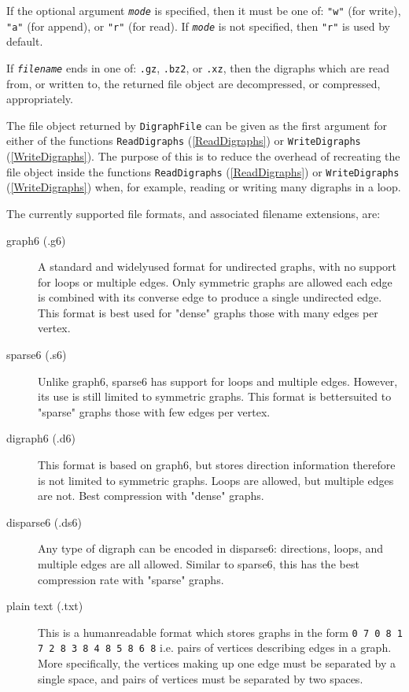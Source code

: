 \documentclass[a4paper,11pt]{report}
\begin{document}
{{{ If the optional argument \mbox{\texttt{\mdseries\slshape mode}} is specified, then it must be one of: \texttt{"w"} (for write), \texttt{"a"} (for append), or \texttt{"r"} (for read). If \mbox{\texttt{\mdseries\slshape mode}} is not specified, then \texttt{"r"} is used by default. 

 If \mbox{\texttt{\mdseries\slshape filename}} ends in one of: \texttt{.gz}, \texttt{.bz2}, or \texttt{.xz}, then the digraphs which are read from, or written to, the returned file
object are decompressed, or compressed, appropriately. 

 The file object returned by \texttt{DigraphFile} can be given as the first argument for either of the functions \texttt{ReadDigraphs} (\ref{ReadDigraphs}) or \texttt{WriteDigraphs} (\ref{WriteDigraphs}). The purpose of this is to reduce the overhead of recreating the file object
inside the functions \texttt{ReadDigraphs} (\ref{ReadDigraphs}) or \texttt{WriteDigraphs} (\ref{WriteDigraphs}) when, for example, reading or writing many digraphs in a loop. 

 The currently supported file formats, and associated filename extensions, are: 
\begin{description}
\item[{graph6 (.g6)}]  A standard and widely\texttt{}used format for undirected graphs,
with no support for loops or multiple edges. Only symmetric graphs are allowed
\texttt{}\texttt{} each edge is combined with its
converse edge to produce a single undirected edge. This format is best used
for "dense" graphs \texttt{}\texttt{} those with many
edges per vertex. 
\item[{sparse6 (.s6)}]  Unlike graph6, sparse6 has support for loops and multiple edges. However, its
use is still limited to symmetric graphs. This format is
better\texttt{}suited to "sparse" graphs
\texttt{}\texttt{} those with few edges per vertex. 
\item[{digraph6 (.d6)}]  This format is based on graph6, but stores direction information
\texttt{} therefore is not limited to symmetric graphs. Loops are
allowed, but multiple edges are not. Best compression with "dense" graphs. 
\item[{disparse6 (.ds6)}]  Any type of digraph can be encoded in disparse6: directions, loops, and
multiple edges are all allowed. Similar to sparse6, this has the best
compression rate with "sparse" graphs. 
\item[{plain text (.txt)}]  This is a human\texttt{}readable format which stores graphs in the
form \texttt{0 7 0 8 1 7 2 8 3 8 4 8 5 8 6 8} i.e. pairs of vertices describing edges in a graph. More specifically, the
vertices making up one edge must be separated by a single space, and pairs of
vertices must be separated by two spaces. 


\end{description}}}}
\end{document}
